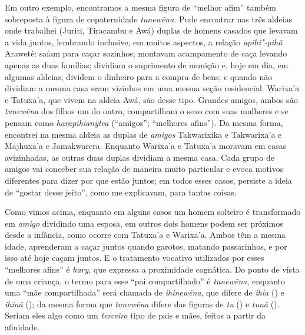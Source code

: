 Em outro exemplo, encontramos a mesma figura de ``melhor afim'' também
sobreposta à figura de copaternidade \emph{tunewẽna}. Pude encontrar nas
três aldeias onde trabalhei (Juriti, Tiracambu e Awá) duplas de
homens casados que levavam a vida juntos, lembrando inclusive, em muitos
aspectos, a relação \emph{apĩhi"-pihã} Araweté: saíam para caçar
sozinhos; montavam acampamento de caça levando apenas as duas famílias;
dividiam o suprimento de munição e, hoje em dia, em algumas aldeias,
dividem o dinheiro para a compra de bens; e quando não dividiam a mesma
casa eram vizinhos em uma mesma seção residencial. Warixa'a e Tatuxa'a,
que vivem na aldeia Awá, são desse tipo. Grandes amigos, ambos
são \emph{tunewẽna} dos filhos um do outro, compartilham o sexo com suas
mulheres e se pensam como \emph{harapihianỹtea} (``amigos''; ``melhores
afins''). Da mesma forma, encontrei na mesma aldeia as duplas de
\emph{amigos} Takwarixika e Takwarixa'a e Majhuxa'a e Jamakwarera.
Enquanto Warixa'a e Tatuxa'a moravam em casas avizinhadas, as outras
duas duplas dividiam a mesma casa. Cada grupo de amigos vai conceber sua
relação de maneira muito particular e evoca motivos diferentes para
dizer por que estão juntos; em todos esses casos, persiste a ideia de
``gostar desse jeito'', como me explicavam, para tantas coisas.

Como vimos acima, enquanto em alguns casos um homem solteiro é
transformado em \emph{amigo} dividindo uma esposa, em outros dois homens
podem ser próximos desde a infância, como ocorre com Tatuxa'a e
Warixa'a. Ambos têm a mesma idade, aprenderam a caçar juntos quando
garotos, matando passarinhos, e por isso até hoje caçam juntos. E o
tratamento vocativo utilizados por esses ``melhores afins'' é
\emph{hary}, que expressa a proximidade cognática. Do ponto de vista de
uma criança, o termo para esse ``pai compartilhado'' é \emph{tunewẽna},
enquanto uma ``mãe compartilhada'' será chamada de \emph{ihinewẽna}, que
difere de \emph{ihia} () e \emph{ihinã} (); da mesma forma que
\emph{tunewẽna} difere das figuras de \emph{tu} () e \emph{tunã} ().
Seriam eles algo como um \emph{terceiro} tipo de pais e mães, feitos a
partir da afinidade.

